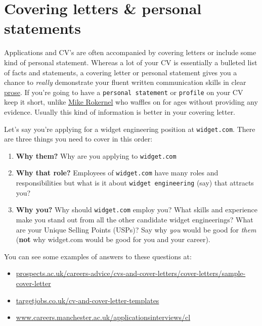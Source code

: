 \documentclass[
]{book}
\providecommand{\tightlist}{%
  \setlength{\itemsep}{0pt}\setlength{\parskip}{0pt}}
\begin{document}
\hypertarget{we3qs}{%
\section{Covering letters \& personal statements}\label{we3qs}}

Applications and CV's are often accompanied by covering letters or include some kind of personal statement. Whereas a lot of your CV is essentially a bulleted list of facts and statements, a covering letter or personal statement gives you a chance to \emph{really} demonstrate your fluent written communication skills in clear \href{https://en.wikipedia.org/wiki/Prose}{prose}. If you're going to have a \texttt{personal\ statement} or \texttt{profile} on your CV keep it short, unlike \href{https://www.cdyf.me/mike_rokernel.pdf}{Mike Rokernel} who waffles on for ages without providing any evidence. Usually this kind of information is better in your covering letter.

Let's say you're applying for a widget engineering position at \texttt{widget.com}. There are three things you need to cover in this order:

\begin{enumerate}
\def\labelenumi{\arabic{enumi}.}
\tightlist
\item
  \textbf{Why them?} Why are you applying to \texttt{widget.com}
\item
  \textbf{Why that role?} Employees of \texttt{widget.com} have many roles and responsibilities but what is it about \texttt{widget\ engineering} (say) that attracts you?
\item
  \textbf{Why you?} Why should \texttt{widget.com} employ you? What skills and experience make you stand out from all the other candidate widget engineerings? What are your Unique Selling Points (USPs)? Say why \emph{you} would be good for \emph{them} (\textbf{not} why widget.com would be good for you and your career).
\end{enumerate}

You can see some examples of answers to these questions at:

\begin{itemize}
\tightlist
\item
  \href{https://www.prospects.ac.uk/careers-advice/cvs-and-cover-letters/cover-letters/sample-cover-letter}{prospects.ac.uk/careers-advice/cvs-and-cover-letters/cover-letters/sample-cover-letter}
\item
  \href{https://targetjobs.co.uk/cv-and-cover-letter-templates}{targetjobs.co.uk/cv-and-cover-letter-templates}
\item
  \href{https://www.careers.manchester.ac.uk/applicationsinterviews/cl/}{www.careers.manchester.ac.uk/applicationsinterviews/cl}
\end{itemize}
\end{document}
